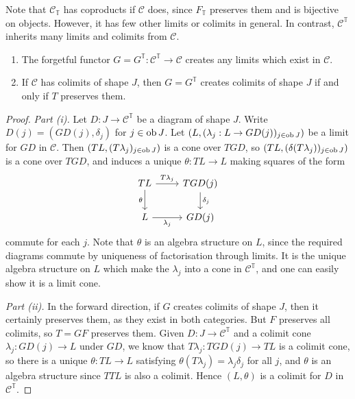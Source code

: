 \begin{remark}
    Note that \( \mathcal C_{\mathbb T} \) has coproducts if \( \mathcal C \) does, since \( F_{\mathbb T} \) preserves them and is bijective on objects.
    However, it has few other limits or colimits in general.
    In contrast, \( \mathcal C^{\mathbb T} \) inherits many limits and colimits from \( \mathcal C \).
\end{remark}
\begin{proposition}
    \begin{enumerate}
        \item The forgetful functor \( G = G^{\mathbb T} : \mathcal C^{\mathbb T} \to \mathcal C \) creates any limits which exist in \( \mathcal C \).
        \item If \( \mathcal C \) has colimits of shape \( J \), then \( G = G^{\mathbb T} \) creates colimits of shape \( J \) if and only if \( T \) preserves them.
    \end{enumerate}
\end{proposition}
\begin{proof}
    \emph{Part (i).}
    Let \( D : J \to \mathcal C^{\mathbb T} \) be a diagram of shape \( J \).
    Write \( D(j) = (GD(j), \delta_j) \) for \( j \in \operatorname{ob} J \).
    Let \( (L, (\lambda_j : L \to GD(j))_{j \in \operatorname{ob} J}) \) be a limit for \( GD \) in \( \mathcal C \).
    Then \( (TL, (T\lambda_j)_{j \in \operatorname{ob} J}) \) is a cone over \( TGD \), so \( (TL, (\delta(T\lambda_j))_{j \in \operatorname{ob} J}) \) is a cone over \( TGD \), and induces a unique \( \theta : TL \to L \) making squares of the form
\[\begin{tikzcd}
	TL & {TGD(j)} \\
	L & {GD(j)}
	\arrow["{T\lambda_j}", from=1-1, to=1-2]
	\arrow["{\delta_j}", from=1-2, to=2-2]
	\arrow["\theta"', from=1-1, to=2-1]
	\arrow["{\lambda_j}"', from=2-1, to=2-2]
\end{tikzcd}\]
    commute for each \( j \).
    Note that \( \theta \) is an algebra structure on \( L \), since the required diagrams commute by uniqueness of factorisation through limits.
    It is the unique algebra structure on \( L \) which make the \( \lambda_j \) into a cone in \( \mathcal C^{\mathbb T} \), and one can easily show it is a limit cone.

    \emph{Part (ii).}
    In the forward direction, if \( G \) creates colimits of shape \( J \), then it certainly preserves them, as they exist in both categories.
    But \( F \) preserves all colimits, so \( T = GF \) preserves them.
    Given \( D : J \to \mathcal C^{\mathbb T} \) and a colimit cone \( \lambda_j : GD(j) \to L \) under \( GD \), we know that \( T\lambda_j : TGD(j) \to TL \) is a colimit cone, so there is a unique \( \theta : TL \to L \) satisfying \( \theta(T\lambda_j) = \lambda_j \delta_j \) for all \( j \), and \( \theta \) is an algebra structure since \( TTL \) is also a colimit.
    Hence \( (L, \theta) \) is a colimit for \( D \) in \( \mathcal C^{\mathbb T} \).
\end{proof}
